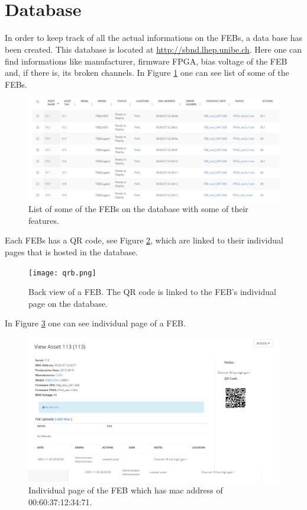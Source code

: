 \documentclass[a4paper]{article}\linespread{1.4}
\begin{document}

\newpage
\appendix

\section{\\ Database} \label{App:AppendixA}

In order to keep track of all the actual informations on the FEBs, a data base has been created. This database is located at \url{http://sbnd.lhep.unibe.ch}.
Here one can find informations like manufacturer, firmware FPGA, bias voltage of the FEB and, if there is, its broken channels. In Figure \ref{fig:datab} one can see list of some of the FEBs.
\begin{figure}[h!] \hspace*{-1cm} \includegraphics[width=145mm,scale=2.0]{datab.png} \caption{List of some of the FEBs on the database with some of their features.}  \label{fig:datab}\end{figure}
Each FEBs has a QR code, see Figure \ref{fig:qrb}, which are linked to their individual pages that is hosted in the database.
\begin{figure}[h!] \hspace*{-1cm} \texttt{[image: qrb.png]} \caption{Back view of a FEB. The QR code is linked to the FEB's individual page on the database.}  \label{fig:qrb}\end{figure}
In Figure \ref{fig:databb} one can see individual page of a FEB.
\begin{figure}[h!] \hspace*{-1cm} \includegraphics[width=145mm,scale=2.0]{databb.png} \caption{Individual page of the FEB which has mac address of 00:60:37:12:34:71.}  \label{fig:databb}\end{figure}
\end{document}
